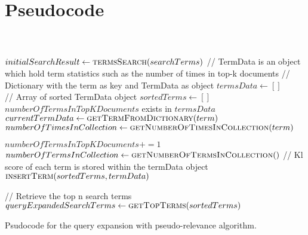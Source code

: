 \section{Pseudocode}
\label{ap:pseudocode}
\begin{algorithm}
  \begin{algorithmic}
     \\
     \\

    \State $initialSearchResult \gets \Call{termsSearch}{searchTerms}$
    \State // TermData is an object which hold term statistics such as the number of times in top-k documents
    \State // Dictionary with the term as key and TermData as object
    \State $termsData \gets [ ]$ \\
    \State // Array of sorted TermData object
    \State $sortedTerms \gets [ ]$ \\

    \State $numberOfTermsInTopKDocuments$
         exists in $termsData$
          \State $currentTermData \gets \Call{getTermFromDictionary}{term}$
          \State {}
        \Else
          \State $numberOfTimesInCollection \gets \Call{getNumberOfTimesInCollection}{term}$
          \State {}
        \EndIf

        \State $numberOfTermsInTopKDocuments += 1$
      \EndFor
    \EndFor \\

    \State $numberOfTermsInCollection \gets \Call{getNumberOfTermsInCollection}$
      \State // Kl score of each term is stored within the termData object
      \State {}
      \State $\Call{insertTerm}{sortedTerms, termData}$
    \EndFor

    \State {}

    \State // Retrieve the top n search terms
    \State $queryExpandedSearchTerms \gets \Call{getTopTerms}{sortedTerms}$

  \end{algorithmic}
  \caption{Psudocode for the query expansion with pseudo-relevance algorithm.}
\end{algorithm}

